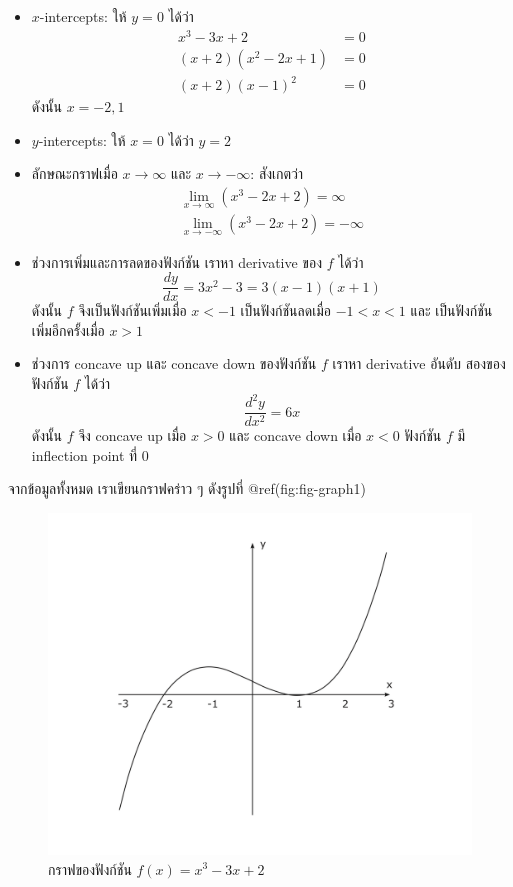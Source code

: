 \documentclass[
]{book}
\begin{document}
\begin{itemize}
\item
  \(x\)-intercepts: ให้ \(y=0\) ได้ว่า \begin{equation}   \begin{aligned}
      x^3-3x+2 &= 0 \\
      (x+2)(x^2-2x+1) &= 0 \\
      (x+2)(x-1)^2 &= 0
    \end{aligned} \end{equation} ดังนั้น \(x=-2, 1\)
\item
  \(y\)-intercepts: ให้ \(x=0\) ได้ว่า \(y=2\)
\item
  ลักษณะกราฟเมื่อ \(x \to \infty\) และ \(x \to -\infty\): สังเกตว่า
  \begin{equation}   \begin{aligned}
      \lim_{x\to \infty} (x^3-2x+2) = \infty \\
      \lim_{x\to -\infty} (x^3-2x+2) = -\infty
    \end{aligned} \end{equation}
\item
  ช่วงการเพิ่มและการลดของฟังก์ชัน เราหา derivative ของ \(f\) ได้ว่า
  \[\frac{dy}{dx} = 3x^2-3 = 3(x-1)(x+1)\] ดังนั้น \(f\) จึงเป็นฟังก์ชันเพิ่มเมื่อ
  \(x < -1\) เป็นฟังก์ชันลดเมื่อ \(-1 < x < 1\) และ เป็นฟังก์ชันเพิ่มอีกครั้งเมื่อ
  \(x>1\)
\item
  ช่วงการ concave up และ concave down ของฟังก์ชัน \(f\) เราหา derivative
  อันดับ สองของฟังก์ชัน \(f\) ได้ว่า \[\frac{d^2y}{dx^2} = 6x\] ดังนั้น \(f\) จึง
  concave up เมื่อ \(x>0\) และ concave down เมื่อ \(x<0\) ฟังก์ชัน \(f\) มี
  inflection point ที่ \(0\)
\end{itemize}

จากข้อมูลทั้งหมด เราเขียนกราฟคร่าว ๆ ดังรูปที่ @ref(fig:fig-graph1)

\begin{figure}

{\centering \includegraphics[width=0.5\linewidth]{images/graph1} 

}

\caption{กราฟของฟังก์ชัน $f(x) =  x^3 - 3x + 2$}\label{fig:fig-graph1}
\end{figure}
\end{document}
